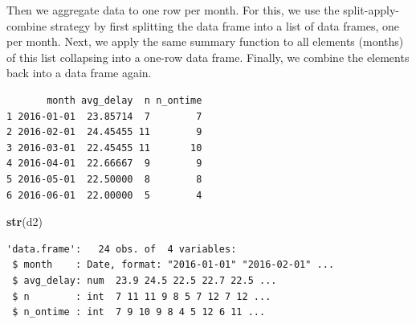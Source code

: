 \documentclass[
]{book}
\newenvironment{Shaded}{\begin{snugshade}}{\end{snugshade}}
\newcommand{\AttributeTok}[1]{\textcolor[rgb]{0.13,0.29,0.53}{#1}}
\newcommand{\CommentTok}[1]{\textcolor[rgb]{0.56,0.35,0.01}{\textit{#1}}}
\newcommand{\ConstantTok}[1]{\textcolor[rgb]{0.56,0.35,0.01}{#1}}
\newcommand{\ControlFlowTok}[1]{\textcolor[rgb]{0.13,0.29,0.53}{\textbf{#1}}}
\newcommand{\DecValTok}[1]{\textcolor[rgb]{0.00,0.00,0.81}{#1}}
\newcommand{\FunctionTok}[1]{\textcolor[rgb]{0.13,0.29,0.53}{\textbf{#1}}}
\newcommand{\NormalTok}[1]{#1}
\newcommand{\OtherTok}[1]{\textcolor[rgb]{0.56,0.35,0.01}{#1}}
\newcommand{\SpecialCharTok}[1]{\textcolor[rgb]{0.81,0.36,0.00}{\textbf{#1}}}
\begin{document}
Then we aggregate data to one row per month. For this, we use the
split-apply-combine strategy by first splitting the data frame into a
list of data frames, one per month. Next, we apply the same summary
function to all elements (months) of this list collapsing into a one-row
data frame. Finally, we combine the elements back into a data frame
again.

\begin{Shaded}
\end{Shaded}

\begin{verbatim}
       month avg_delay  n n_ontime
1 2016-01-01  23.85714  7        7
2 2016-02-01  24.45455 11        9
3 2016-03-01  22.45455 11       10
4 2016-04-01  22.66667  9        9
5 2016-05-01  22.50000  8        8
6 2016-06-01  22.00000  5        4
\end{verbatim}

\begin{Shaded}
\begin{Highlighting}[]
\FunctionTok{str}\NormalTok{(d2)}
\end{Highlighting}
\end{Shaded}

\begin{verbatim}
'data.frame':   24 obs. of  4 variables:
 $ month    : Date, format: "2016-01-01" "2016-02-01" ...
 $ avg_delay: num  23.9 24.5 22.5 22.7 22.5 ...
 $ n        : int  7 11 11 9 8 5 7 12 7 12 ...
 $ n_ontime : int  7 9 10 9 8 4 5 12 6 11 ...
\end{verbatim}
\end{document}
